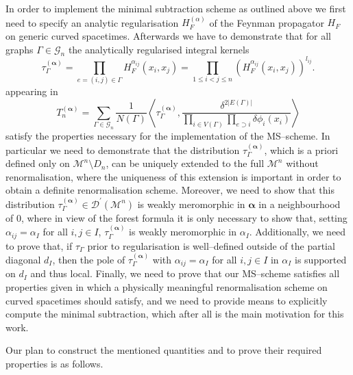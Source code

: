 \documentclass[10pt]{book}
\newcommand{\Dcal}{\mathcal{D}}
\newcommand{\Gcal}{\mathcal{G}}
\newcommand{\Mcal}{\mathcal{M}}
\theoremstyle{break}
\begin{document}
In order to implement the minimal subtraction scheme as outlined above we first need to specify an analytic regularisation $H^{(\alpha)}_F$ of the Feynman propagator $H_F$ on generic curved spacetimes. Afterwards we have to demonstrate that for all graphs $\Gamma\in\Gcal_n$ the analytically regularised integral kernels 
%
\begin{equation*}
\tau^{(\boldsymbol{\alpha})}_\Gamma = \prod_{e=(i,j)\in \Gamma} H^{\alpha_{ij}}_F(x_{i},x_{j})=\prod_{1\le i<j\le n} \left(H^{\alpha_{ij}}_F(x_{i},x_{j})\right)^{l_{ij}}.
\end{equation*}
%
appearing in
%
\begin{equation*}
T^{(\boldsymbol{\alpha})}_n = \sum_{\Gamma\in \mathcal{G}_n}  \frac{1}{N(\Gamma)}    \left\langle  \tau^{(\boldsymbol{\alpha})}_\Gamma  , \frac{\delta^{2|E(\Gamma)|}}{   \prod_{i \in V(\Gamma)} \prod_{e \supset i}    \delta \phi_i(x_{i}) } \right\rangle 
\end{equation*}
%
satisfy the properties necessary for the implementation of the MS--scheme. In particular we need to demonstrate that the distribution $\tau^{(\boldsymbol{\alpha})}_\Gamma$, which is a priori defined only on $\Mcal^n\setminus D_n$, can be uniquely extended to the full $\Mcal^n$ without renormalisation, where the uniqueness of this extension is important in order to obtain a definite renormalisation scheme. Moreover, we need to show that this distribution $\tau^{(\boldsymbol{\alpha})}_\Gamma\in\Dcal^\prime(\Mcal^n)$ is weakly meromorphic in $\boldsymbol{\alpha}$ in a neighbourhood of 0, where in view of the forest formula it is only necessary to show that, setting $\alpha_{ij}=\alpha_I$ for all $i,j\in I$, $\tau^{(\boldsymbol{\alpha})}_\Gamma$ is weakly meromorphic in $\alpha_I$. Additionally, we need to prove that, if $\tau_\Gamma$ prior to regularisation is well--defined outside of the partial diagonal $d_{I}$, then the pole of $\tau^{(\boldsymbol{\alpha})}_\Gamma$ with $\alpha_{ij}=\alpha_I$ for all $i,j\in I$ in $\alpha_I$ is supported on $d_I$ and thus local. Finally, we need 
to prove that our MS--scheme satisfies all properties given in %
which a physically meaningful renormalisation scheme on curved spacetimes should satisfy, and we need to provide means to explicitly compute the minimal subtraction, which after all is the main motivation for this work.

Our plan to construct the mentioned quantities and to prove their required properties is as follows.
\end{document}
